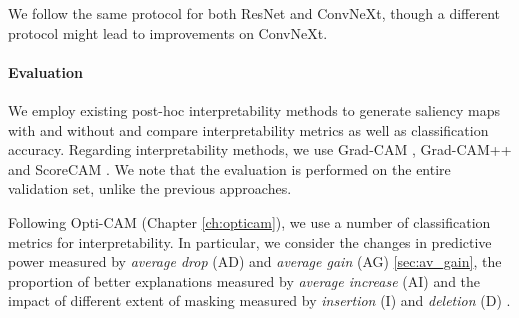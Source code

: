We follow the same protocol for both ResNet and ConvNeXt, though a different protocol might lead to 
improvements on ConvNeXt.


\paragraph{Evaluation}
We employ existing post-hoc interpretability methods to generate saliency maps with and without 
\Ours and compare interpretability metrics as well as classification accuracy. Regarding 
interpretability methods, we use Grad-CAM \autocite{selvaraju2017grad}, 
Grad-CAM++ \autocite{chattopadhay2018grad} and ScoreCAM \autocite{wang2020score}. We note that the 
evaluation is performed on the entire validation set, unlike the previous approaches.

Following Opti-CAM (Chapter \ref{ch:opticam}), we use a number of classification metrics for 
interpretability. In particular, we consider the changes in predictive power measured by 
\emph{average drop} (AD) \autocite{chattopadhay2018grad} and \emph{average gain} (AG) 
\autoref{sec:av_gain}, the proportion of better explanations measured by \emph{average increase} (AI) 
\autocite{chattopadhay2018grad} and the impact of different extent of masking measured by 
\emph{insertion} (I) and \emph{deletion} (D) \autocite{petsiuk2018rise}.




